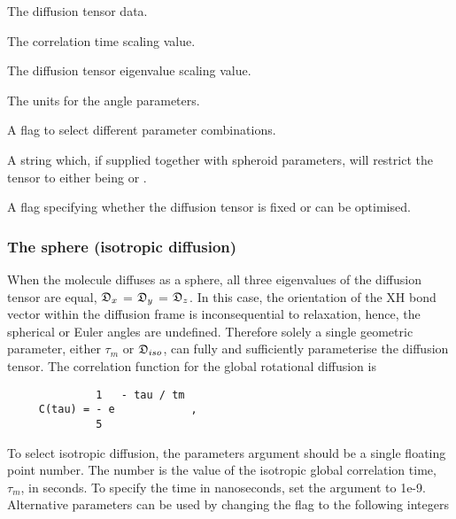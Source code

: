    The diffusion tensor data.   

   The correlation time scaling value.   

   The diffusion tensor eigenvalue scaling value.   

   The units for the angle parameters.   

   A flag to select different parameter combinations.   

   A string which, if supplied together with spheroid parameters, will restrict the tensor to either being  or .   

   A flag specifying whether the diffusion tensor is fixed or can be optimised.  

  

  
 \subsubsection{The sphere (isotropic diffusion)} 

 When the molecule diffuses as a sphere, all three eigenvalues of the diffusion tensor are equal, $\mathfrak{D}_x$ = $\mathfrak{D}_y$ = $\mathfrak{D}_z$.  In this case, the orientation of the XH bond vector within the diffusion frame is inconsequential to relaxation, hence, the spherical or Euler angles are undefined.  Therefore solely a single geometric parameter, either $\tau_m$ or $\mathfrak{D}_{iso}$, can fully and sufficiently parameterise the diffusion tensor.  The correlation function for the global rotational diffusion is 
  

 {\footnotesize \begin{verbatim} 
              1   - tau / tm 
     C(tau) = - e            , 
              5 
 \end{verbatim}} 

 To select isotropic diffusion, the parameters argument should be a single floating point number.  The number is the value of the isotropic global correlation time, $\tau_m$, in seconds. To specify the time in nanoseconds, set the  argument to 1e-9.  Alternative parameters can be used by changing the  flag to the following integers 
  

